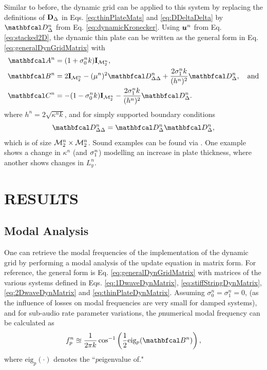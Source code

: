 \documentclass[fleqn]{jaes}
\begin{document}
Similar to before, the dynamic grid can be applied to this system by replacing the definitions of $\mathbf{D}_\Delta$ in Eqs. \eqref{eq:thinPlateMats} and \eqref{eq:DDeltaDelta} by $\DDDelta$ from Eq. \eqref{eq:dynamicKronecker}. Using $\boldsymbol{u}^n$ from Eq. \eqref{eq:stacked2D}, the dynamic thin plate can be written as the general form in Eq. \eqref{eq:generalDynGridMatrix} with
\begin{equation}\label{eq:thinPlateDynMatrix}
\begin{aligned}
    \AA &= (1+\sigma_0^nk)\I_\MtwoD, \\
    \BB &= 2\I_\MtwoD - (\mu^n)^2 \DDDeltaDelta + \frac{2\sigma_1^nk}{(h^n)^2}\DDDelta,\quad \text{and}\\
    \CC &= -(1-\sigma_0^nk)\I_\MtwoD - \frac{2\sigma_1^nk}{(h^n)^2}\DDDelta.
    \end{aligned}
\end{equation}
where $h^n = 2\sqrt{\kappa^n k}$, and for simply supported boundary conditions 
\begin{equation}\label{eq:4thOrder2D}
    \DDDeltaDelta = \DDDelta\DDDelta,
\end{equation}
which is of size ${\mathcal{M}_2^n} \times {\mathcal{M}_2^n}$. Sound examples can be found via \cite{soundExamples}. One example shows a change in $\kappa^n$ (and $\sigma_{1}^n$) modelling an increase in plate thickness, where another shows changes in $L_y^n$. 

\section{RESULTS}\label{sec:analysis}

\subsection{Modal Analysis}
One can retrieve the modal frequencies of the implementation of the dynamic grid by performing a modal analysis of the update equation in matrix form. For reference, the general form is Eq. \eqref{eq:generalDynGridMatrix} with matrices of the various systems defined in Eqs. \eqref{eq:1DwaveDynMatrix}, \eqref{eq:stiffStringDynMatrix}, \eqref{eq:2DwaveDynMatrix} and \eqref{eq:thinPlateDynMatrix}. Assuming $\sigma_0^n = \sigma_1^n = 0$, (as the influence of losses on modal frequencies are very small for damped systems), and for sub-audio rate parameter variations, the $p$\th numerical modal frequency can be calculated as
\begin{equation}\label{eq:modalAnalysis}
    f_p^n \approxeq \frac{1}{2 \pi k}\cos^{-1}\left(\frac{1}{2}\text{eig}_p(\BB)\right),
\end{equation}
where $\text{eig}_p(\cdot)$ denotes the ``$p$\th eigenvalue of."
\end{document}
